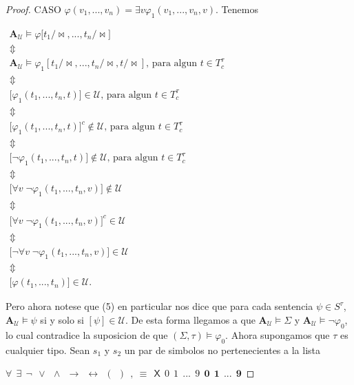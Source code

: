 \begin{proof}
    CASO \(\varphi (v_{1},...,v_{n})=\exists v\varphi _{1}(v_{1},...,v_{n},v).\)
    Tenemos

    \(\displaystyle \begin{array}{c} \mathbf{A}_{\mathcal{U}}\models \varphi \lbrack t_{1}/\mathrm{\bowtie } ,...,t_{n}/\mathrm{\bowtie }] \\ \Updownarrow \\ \mathbf{A}_{\mathcal{U}}\models \varphi _{1}[t_{1}/\mathrm{\bowtie } ,...,t_{n}/\mathrm{\bowtie },t/\mathrm{\bowtie }]\text{, para algun }t\in T_{c}^{\tau } \\ \Updownarrow \\ \lbrack \varphi _{1}(t_{1},...,t_{n},t)]\in \mathcal{U}\text{, para algun } t\in T_{c}^{\tau } \\ \Updownarrow \\ \lbrack \varphi _{1}(t_{1},...,t_{n},t)]^{c}\not\in \mathcal{U}\text{, para algun }t\in T_{c}^{\tau } \\ \Updownarrow \\ \lbrack \lnot \varphi _{1}(t_{1},...,t_{n},t)]\not\in \mathcal{U}\text{, para algun }t\in T_{c}^{\tau } \\ \Updownarrow \\ \lbrack \forall v\;\lnot \varphi _{1}(t_{1},...,t_{n},v)]\not\in \mathcal{U} \\ \Updownarrow \\ \lbrack \forall v\;\lnot \varphi _{1}(t_{1},...,t_{n},v)]^{c}\in \mathcal{U} \\ \Updownarrow \\ \lbrack \lnot \forall v\;\lnot \varphi _{1}(t_{1},...,t_{n},v)]\in \mathcal{U } \\ \Updownarrow \\ \lbrack \varphi (t_{1},...,t_{n})]\in \mathcal{U}. \end{array} \)

    Pero ahora notese que (5) en particular nos dice que para cada sentencia \( \psi \in S^{\tau }\), \(\mathbf{A}_{\mathcal{U}}\models \psi \) si y solo si \( [\psi ]\in \mathcal{U}.\) De esta forma llegamos a que \(\mathbf{A}_{\mathcal{U }}\models \Sigma \) y \(\mathbf{A}_{\mathcal{U}}\models \lnot \varphi _{0}\), lo cual contradice la suposicion de que \((\Sigma ,\tau )\models \varphi _{0}. \)
    Ahora supongamos que \(\tau \) es cualquier tipo. Sean \(s_{1}\) y \(s_{2}\) un par de simbolos no pertenecientes a la lista

    \(\displaystyle \forall \ \ \exists \ \ \lnot \ \ \vee \ \ \wedge \ \ \rightarrow \ \ \leftrightarrow \ \ (\ \ )\ \ ,\ \equiv \ \ \mathsf{X}\ \ \mathit{0}\ \ \mathit{1}\ \ ...\ \ \mathit{9}\ \ \mathbf{0}\ \ \mathbf{1}\ \ ...\ \ \mathbf{9} \)


\end{proof}
